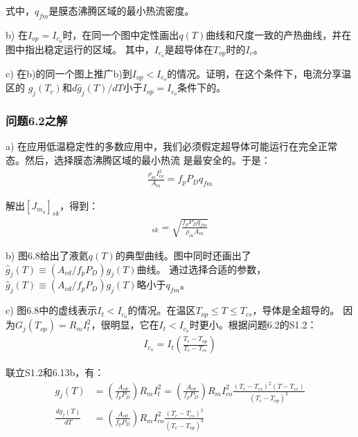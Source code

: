 式中，$q_{fm}$是膜态沸腾区域的最小热流密度。

b) 在$I_{op}=I_{c_o}$时，在同一个图中定性画出$q(T)$曲线和尺度一致的产热曲线，并在图中指出稳定运行的区域。
其中，$I_{c_o}$是超导体在$T_{op}$时的$I_c$。

c) 在b)的同一个图上推广b)到$I_{op}<I_{c_o}$的情况。证明，在这个条件下，电流分享温区的
$g_j(T_c)$和$d\hat{g}_j(T)/dT$小于$I_{op}=I_{c_o}$条件下的。

\subsubsection{问题6.2之解}
a) 在应用低温稳定性的多数应用中，我们必须假定超导体可能运行在完全正常态。然后，选择膜态沸腾区域的最小热流
是最安全的。于是：
\begin{align*}%
\frac {\rho_mI_{co}^2}{A_m}=f_pP_Dq_{fm} \tag{S2.1}
\end{align*}

解出$[J_{m_o}]_{sk}$，得到：
\begin{align*}%
[J_{m_o}]_{sk}=\sqrt{\frac{f_pP_Dq_{fm}}{\rho_mA_m}} \tag{6.22}
\end{align*}

b) 图6.8给出了液氦$q(T)$的典型曲线。图中同时还画出了$\hat{g}_j(T)\equiv (A_{cd}/f_p P_D)g_j(T)$曲线。
通过选择合适的参数，$\hat{g}_j(T)\equiv (A_{cd}/f_p P_D)g_j(T)$略小于$q_{fm}$。

c) 图6.8中的虚线表示$I_t<I_{c_o}$的情况。在温区$T_{op}\le T\le T_{cs}$，导体是全超导的。
因为$G_j(T_{op})=R_m I_t^2$，很明显，它在$I_t<I_{c_o}$时更小。根据问题6.2的S1.2：
\begin{align*}%
I_{c_o}=I_t(\frac{T_c-T_{op} }{T_c-T_{cs}}) \tag{S1.2}
\end{align*}

联立S1.2和6.13b，有：
\begin{align*}%
g_j(T)&=(\frac{A_{cd}}{f_pP_D})R_mI_t^2=(\frac{A_{cd}}{f_pP_D})R_mI_{co}^2\frac{(T_c-T_{cs})^2(T-T_{cs})}{(T_c-T_{op})^3}\\
\frac{dg_j(T)}{dT}&=(\frac{A_{cd}}{f_pP_D})R_mI_{co}^2\frac{(T_c-T_{cs})^2}{(T_c-T_{op})^3}
\end{align*}

